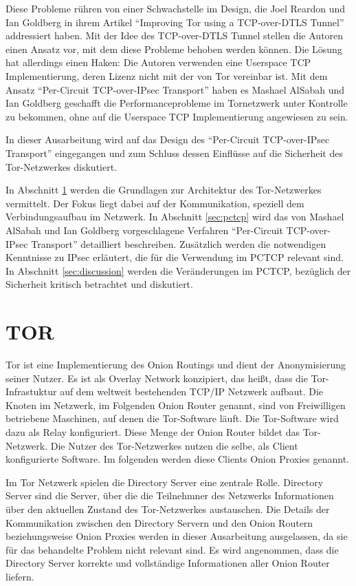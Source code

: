 \documentclass[fleqn,envcountsame,runningheads,10pt,a4paper]{llncs}
\begin{document}
Diese Probleme rühren von einer Schwachstelle im Design, die Joel Reardon und 
Ian Goldberg in ihrem Artikel ``Improving Tor using a TCP-over-DTLS 
Tunnel'' addressiert haben. Mit der Idee des TCP-over-DTLS Tunnel stellen die 
Autoren einen Ansatz vor, mit dem diese Probleme behoben werden können. Die 
Lösung hat allerdings einen Haken: Die Autoren verwenden eine Userspace TCP 
Implementierung, deren Lizenz nicht mit der von Tor vereinbar ist. Mit 
dem Ansatz ``Per-Circuit TCP-over-IPsec Transport'' haben es Mashael AlSabah und 
Ian Goldberg geschafft die Performanceprobleme im Tornetzwerk unter Kontrolle zu 
bekommen, ohne auf die Userspace TCP Implementierung angewiesen zu sein.

In dieser Ausarbeitung wird auf das Design des ``Per-Circuit TCP-over-IPsec 
Transport'' eingegangen und zum Schluss dessen Einflüsse auf die Sicherheit des 
Tor-Netzwerkes diskutiert.

In Abschnitt \ref{sec:tor} werden die Grundlagen zur Architektur des 
Tor-Netzwerkes vermittelt. Der Fokus liegt dabei auf der Kommunikation, 
speziell dem Verbindungsaufbau im Netzwerk. In Abschnitt \ref{sec:pctcp} wird 
das von Mashael AlSabah und Ian Goldberg vorgeschlagene Verfahren ``Per-Circuit 
TCP-over-IPsec Transport'' detailliert beschreiben. Zusätzlich werden die 
notwendigen Kenntnisse zu IPsec erläutert, die für die Verwendung im PCTCP 
relevant sind. In Abschnitt \ref{sec:discussion} werden die Veränderungen im 
PCTCP, bezüglich der Sicherheit kritisch betrachtet und diskutiert.

\newpage
\section{TOR}
\label{sec:tor}

Tor ist eine Implementierung des Onion Routings und dient der 
Anonymisierung seiner Nutzer. Es ist als Overlay Network konzipiert, das heißt, 
dass die Tor-Infrastuktur auf dem weltweit bestehenden TCP/IP Netzwerk 
aufbaut. Die Knoten im Netzwerk, im Folgenden Onion Router genannt, sind von 
Freiwilligen betriebene Maschinen, auf denen die Tor-Software läuft. 
Die Tor-Software wird dazu als Relay konfiguriert. Diese Menge der 
Onion Router bildet das Tor-Netzwerk. Die Nutzer des 
Tor-Netzwerkes nutzen die selbe, als Client konfigurierte Software. Im 
folgenden werden diese Clients Onion Proxies genannt.

Im Tor Netzwerk spielen die Directory Server eine zentrale Rolle. Directory 
Server sind die Server, über die die Teilnehmner des Netzwerks Informationen 
über den aktuellen Zustand des Tor-Netzwerkes austauschen. Die Details 
der Kommunikation zwischen den Directory Servern und den Onion Routern 
beziehungsweise Onion Proxies werden in dieser Ausarbeitung ausgelassen, da sie 
für das behandelte Problem nicht relevant sind. Es wird angenommen, dass die 
Directory Server korrekte und vollständige Informationen aller Onion Router 
liefern.
\end{document}
